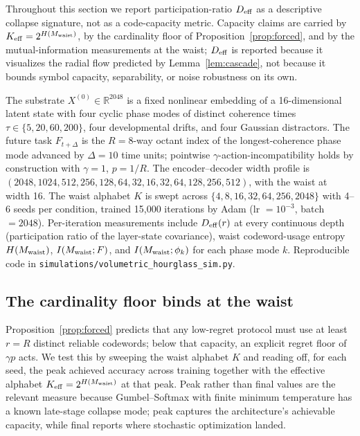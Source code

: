 \documentclass[12pt]{article}
\theoremstyle{definition}
\newcommand{\R}{\mathbb{R}}
\begin{document}
Throughout this section we report participation-ratio $D_{\rm eff}$ as a descriptive collapse signature, not as a code-capacity metric. Capacity claims are carried by $K_{\rm eff}=2^{H(M_{\rm waist})}$, by the cardinality floor of Proposition~\ref{prop:forced}, and by the mutual-information measurements at the waist; $D_{\rm eff}$ is reported because it visualizes the radial flow predicted by Lemma~\ref{lem:cascade}, not because it bounds symbol capacity, separability, or noise robustness on its own.

The substrate $X^{(0)}\in\R^{2048}$ is a fixed nonlinear embedding of a 16-dimensional latent state with four cyclic phase modes of distinct coherence times $\tau\in\{5,20,60,200\}$, four developmental drifts, and four Gaussian distractors. The future task $F_{t+\Delta}$ is the $R=8$-way octant index of the longest-coherence phase mode advanced by $\Delta=10$ time units; pointwise $\gamma$-action-incompatibility holds by construction with $\gamma=1$, $p=1/R$. The encoder--decoder width profile is $(2048,1024,512,256,128,64,32,16,32,64,128,256,512)$, with the waist at width 16. The waist alphabet $K$ is swept across $\{4,8,16,32,64,256,2048\}$ with 4--6 seeds per condition, trained 15{,}000 iterations by Adam (lr $=10^{-3}$, batch $=2048$). Per-iteration measurements include $D_{\rm eff}(r)$ at every continuous depth (participation ratio of the layer-state covariance), waist codeword-usage entropy $H(M_{\rm waist})$, $I(M_{\rm waist};F)$, and $I(M_{\rm waist};\phi_k)$ for each phase mode $k$. Reproducible code in \texttt{simulations/volumetric\_hourglass\_sim.py}.

\subsection{The cardinality floor binds at the waist}

Proposition~\ref{prop:forced} predicts that any low-regret protocol must use at least $r=R$ distinct reliable codewords; below that capacity, an explicit regret floor of $\gamma p$ acts. We test this by sweeping the waist alphabet $K$ and reading off, for each seed, the peak achieved accuracy across training together with the effective alphabet $K_{\rm eff} = 2^{H(M_{\rm waist})}$ at that peak. Peak rather than final values are the relevant measure because Gumbel--Softmax with finite minimum temperature has a known late-stage collapse mode; peak captures the architecture's achievable capacity, while final reports where stochastic optimization landed.
\end{document}
